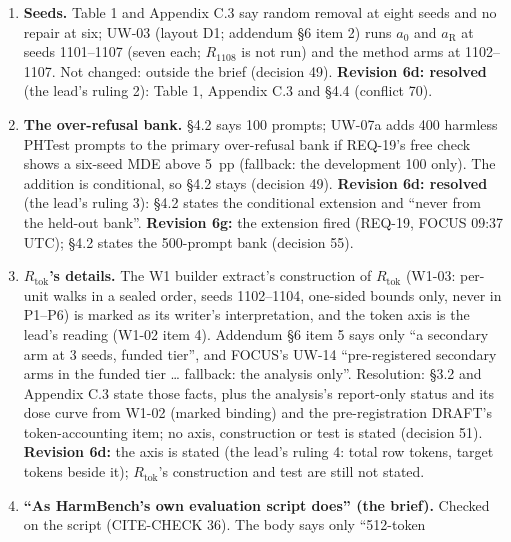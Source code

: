\documentclass{article}
\theoremstyle{plain}
\theoremstyle{definition}
\theoremstyle{remark}
\begin{document}
\begin{enumerate}
        (UW-08 (a)). Resolution: followed the brief; the body keeps these
        markers (decision 49). \textbf{Revision 6d: resolved} by the lead's
        rulings 1--3 (decision 49); decision 53 lists what is still not applied.
  \item \textbf{Seeds.} Table 1 and Appendix C.3 say random removal at eight
        seeds and no repair at six; UW-03 (layout D1; addendum \S{}6 item 2)
        runs $a_0$ and $a_{\mathrm{R}}$ at seeds 1101--1107 (seven each;
        $R_{1108}$ is not run) and the method arms at 1102--1107. Not changed:
        outside the brief (decision 49). \textbf{Revision 6d: resolved} (the
        lead's ruling 2): Table 1, Appendix C.3 and \S{}4.4 (conflict 70).
  \item \textbf{The over-refusal bank.} \S{}4.2 says 100 prompts; UW-07a adds
        400 harmless PHTest prompts to the primary over-refusal bank if REQ-19's
        free check shows a six-seed MDE above 5~pp (fallback: the development
        100 only). The addition is conditional, so \S{}4.2 stays (decision 49).
        \textbf{Revision 6d: resolved} (the lead's ruling 3): \S{}4.2 states the
        conditional extension and ``never from the held-out bank''.
        \textbf{Revision 6g:} the extension fired (REQ-19, FOCUS 09:37 UTC);
        \S{}4.2 states the 500-prompt bank (decision 55).
  \item \textbf{$R_{\mathrm{tok}}$'s details.} The W1 builder extract's
        construction of $R_{\mathrm{tok}}$ (W1-03: per-unit walks in a sealed
        order, seeds 1102--1104, one-sided bounds only, never in P1--P6) is
        marked as its writer's interpretation, and the token axis is the lead's
        reading (W1-02 item 4). Addendum \S{}6 item 5 says only ``a secondary
        arm at 3 seeds, funded tier'', and FOCUS's UW-14 ``pre-registered
        secondary arms in the funded tier \ldots{} fallback: the analysis
        only''. Resolution: \S{}3.2 and Appendix C.3 state those facts, plus the
        analysis's report-only status and its dose curve from W1-02 (marked
        binding) and the pre-registration DRAFT's token-accounting item; no
        axis, construction or test is stated (decision 51). \textbf{Revision
        6d:} the axis is stated (the lead's ruling 4: total row tokens, target
        tokens beside it); $R_{\mathrm{tok}}$'s construction and test are still
        not stated.
  \item \textbf{``As HarmBench's own evaluation script does'' (the brief).}
        Checked on the script (CITE-CHECK 36). The body says only ``512-token

\end{enumerate}
\end{document}
